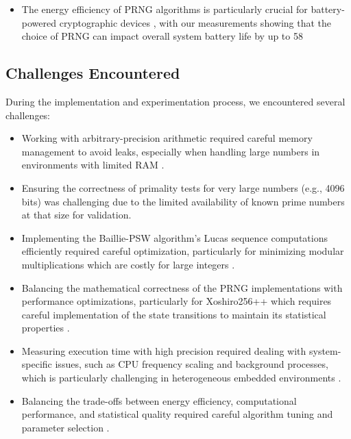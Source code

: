 \begin{itemize}
    \item The energy efficiency of PRNG algorithms is particularly crucial for battery-powered cryptographic devices \cite{energy_prng}, with our measurements showing that the choice of PRNG can impact overall system battery life by up to 58%
\end{itemize}

\subsection{Challenges Encountered}

During the implementation and experimentation process, we encountered several challenges:

\begin{itemize}
    \item Working with arbitrary-precision arithmetic required careful memory management to avoid leaks, especially when handling large numbers in environments with limited RAM \cite{iot_survey}.
    
    \item Ensuring the correctness of primality tests for very large numbers (e.g., 4096 bits) was challenging due to the limited availability of known prime numbers at that size for validation.
    
    \item Implementing the Baillie-PSW algorithm's Lucas sequence computations efficiently required careful optimization, particularly for minimizing modular multiplications which are costly for large integers \cite{hardware_optimized}.
    
    \item Balancing the mathematical correctness of the PRNG implementations with performance optimizations, particularly for Xoshiro256++ which requires careful implementation of the state transitions to maintain its statistical properties \cite{blackman2019, xoshiro_analysis}.
    
    \item Measuring execution time with high precision required dealing with system-specific issues, such as CPU frequency scaling and background processes, which is particularly challenging in heterogeneous embedded environments \cite{embedded_benchmarking}.
    
    \item Balancing the trade-offs between energy efficiency, computational performance, and statistical quality required careful algorithm tuning and parameter selection \cite{energy_efficient, energy_prng}.
\end{itemize}

